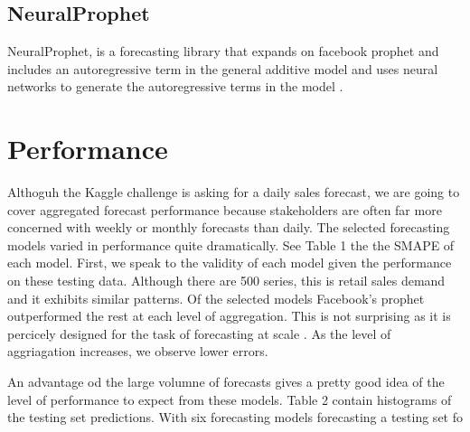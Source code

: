 \documentclass[16pt,twocolumn,letterpaper]{article}
\begin{document}
\subsection{NeuralProphet}

NeuralProphet, is a forecasting library that expands on facebook prophet and includes an autoregressive term in the general additive model and uses neural networks to generate the autoregressive terms in the model \cite{triebe2021neuralprophet}.

\section{Performance}

Althoguh the Kaggle challenge is asking for a daily sales forecast, we are going to cover aggregated forecast performance because stakeholders are often far more concerned with weekly or monthly forecasts than daily. The selected forecasting models varied in performance quite dramatically. See Table 1 the the SMAPE of each model. First, we speak to the validity of each model given the performance on these testing data. Although there are 500 series, this is retail sales demand and it exhibits similar patterns. Of the selected models Facebook's prophet outperformed the rest at each level of aggregation. This is not surprising as it is percicely designed for the task of forecasting at scale \cite{taylor2018forecasting}. As the level of aggriagation increases, we observe lower errors. 

An advantage od the large volumne of forecasts gives a pretty good idea of the level of performance to expect from these models. Table 2 contain histograms of the testing set predictions. With six forecasting models forecasting a testing set fo 
\end{document}
